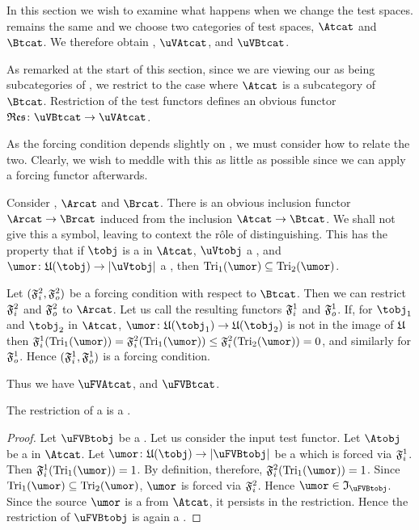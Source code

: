\documentclass[%
a4paper,%
arxiv,%
defaults
]{myclass}
\begin{document}
In this section we wish to examine what happens when we change the test spaces.
\ucatu remains the same and we choose two categories of test spaces, \(\Atcat\) and \(\Btcat\).
We therefore obtain \uVAtcat, \(\uVAtcat\), and \(\uVBtcat\).

As remarked at the start of this section, since we are viewing our \tcats as being subcategories of \mcat, we restrict to the case where \(\Atcat\) is a subcategory of \(\Btcat\).
Restriction of the test functors defines an obvious functor \(\resfunc \colon \uVBtcat \to \uVAtcat\).

As the forcing condition depends slightly on \tcat, we must consider how to relate the two.
Clearly, we wish to meddle with this as little as possible since we can apply a forcing functor afterwards.

Consider \rcats, \(\Arcat\) and \(\Brcat\).
There is an obvious inclusion functor \(\Arcat \to \Brcat\) induced from the inclusion \(\Atcat \to \Btcat\).
We shall not give this a symbol, leaving to context the r\^ole of distinguishing.
This has the property that if \(\tobj\) is a \tobj in \(\Atcat\), \(\uVtobj\) a \uVtobj, and \(\umor \colon \ufunc(\tobj) \to \forfunc[\uVtobj]\) a \umor, then \(\trials[_1]{\umor} \subseteq \trials[_2]{\umor}\).

Let \((\iforce^2, \oforce^2)\) be a forcing condition with respect to \(\Btcat\).
Then we can restrict \(\iforce^2\) and \(\oforce^2\) to \(\Arcat\).
Let us call the resulting functors \(\iforce^1\) and \(\oforce^1\).
If, for \(\tobj_1\) and \(\tobj_2\) in \(\Atcat\), \(\umor \colon \ufunc(\tobj_1) \to \ufunc(\tobj_2)\) is not in the image of \(\ufunc\) then \(\iforce^1(\trials[_1]{\umor}) = \iforce^2(\trials[_1]{\umor}) \le \iforce^2(\trials[_2]{\umor}) = 0\), and similarly for \(\oforce^1\).
Hence \((\iforce^1, \oforce^1)\) is a forcing condition.

Thus we have \(\uFVAtcat\), and \(\uFVBtcat\).

\begin{proposition}
The restriction of a \uFVBtobj is a \uFVAtobj.
\end{proposition}

\begin{proof}
Let \(\uFVBtobj\) be a \uFVBtobj.
Let us consider the input test functor.
Let \(\Atobj\) be a \Atobj in \(\Atcat\).
Let \(\umor \colon \ufunc(\tobj) \to \forfunc[\uFVBtobj]\) be a \umor which is forced via \(\iforce^1\).
Then \(\iforce^1(\trials[_1]{\umor}) = 1\).
By definition, therefore, \(\iforce^2(\trials[_1]{\umor}) = 1\).
Since \(\trials[_1]{\umor} \subseteq \trials[_2]{\umor}\), \(\umor\) is forced via \(\iforce^2\).
Hence \(\umor \in \itest_{\uFVBtobj}\).
Since the source \(\umor\) is a \Atobj from \(\Atcat\), it persists in the restriction.
Hence the restriction of \(\uFVBtobj\) is again a \uFVAtobj.
\end{proof}
\end{document}

